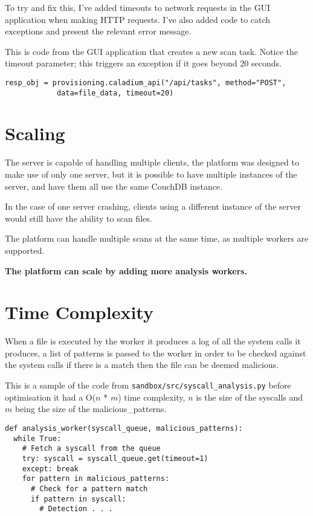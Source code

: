 To try and fix this, I've added timeouts
to network requests in the GUI application when making HTTP requests.
I've also added code to catch exceptions
and present the relevant error message.

This is code from the GUI application that creates a new scan task.
Notice the timeout parameter;
this triggers an exception if it goes beyond 20 seconds.

\begin{lstlisting}
resp_obj = provisioning.caladium_api("/api/tasks", method="POST",
            data=file_data, timeout=20)
\end{lstlisting}

\section{Scaling}
The server is capable of handling multiple clients,
the platform was designed to make use of only one server,
but it is possible to have multiple instances of the server,
and have them all use the same CouchDB instance.

In the case of one server crashing,
clients using a different instance of the server
would still have the ability to scan files.

The platform can handle multiple scans at the same time,
as multiple workers are supported.

\textbf{The platform can scale by adding more analysis workers.}

\section{Time Complexity}
When a file is executed by the worker it produces a log of all the
system calls it produces, a list of patterns is passed to
the worker in order to be checked against the system calls
if there is a match then the file can be deemed malicious.

This is a sample of the code from \texttt{sandbox/src/syscall\_analysis.py}
before optimisation it had a O($n$ * $m$) time complexity,
$n$ is the size of the syscalls
and $m$ being the size of the malicious\_patterns.

\begin{lstlisting}
def analysis_worker(syscall_queue, malicious_patterns):
  while True:
    # Fetch a syscall from the queue
    try: syscall = syscall_queue.get(timeout=1)
    except: break
    for pattern in malicious_patterns:
      # Check for a pattern match
      if pattern in syscall:
        # Detection . . .
\end{lstlisting}

